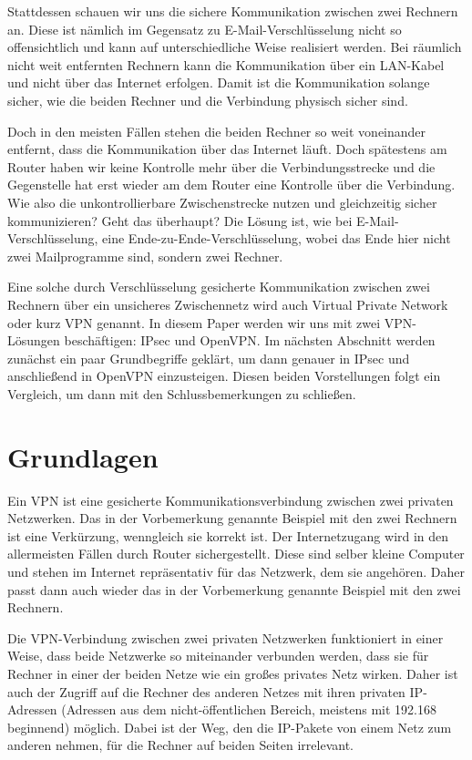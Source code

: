 \documentclass[12pt]{scrartcl}
\begin{document}
Stattdessen schauen wir uns die sichere Kommunikation zwischen zwei Rechnern an. Diese ist nämlich im Gegensatz zu E-Mail-Verschlüsselung nicht so offensichtlich und kann auf unterschiedliche Weise realisiert werden. Bei räumlich nicht weit entfernten Rechnern kann die Kommunikation über ein LAN-Kabel und nicht über das Internet erfolgen. Damit ist die Kommunikation solange sicher, wie die beiden Rechner und die Verbindung physisch sicher sind. 

Doch in den meisten Fällen stehen die beiden Rechner so weit voneinander entfernt, dass die Kommunikation über das Internet läuft. Doch spätestens am Router haben wir keine Kontrolle mehr über die Verbindungsstrecke und die Gegenstelle hat erst wieder am dem Router eine Kontrolle über die Verbindung. Wie also die unkontrollierbare Zwischenstrecke nutzen und gleichzeitig sicher kommunizieren? Geht das überhaupt? Die Lösung ist, wie bei E-Mail-Verschlüsselung, eine Ende-zu-Ende-Verschlüsselung, wobei das Ende hier nicht zwei Mailprogramme sind, sondern zwei Rechner.

Eine solche durch Verschlüsselung gesicherte Kommunikation zwischen zwei Rechnern über ein unsicheres Zwischennetz wird auch Virtual Private Network oder kurz VPN genannt. In diesem Paper werden wir uns mit zwei VPN-Lösungen beschäftigen: IPsec und OpenVPN. Im nächsten Abschnitt werden zunächst ein paar Grundbegriffe geklärt, um dann genauer in IPsec und anschließend in OpenVPN einzusteigen. Diesen beiden Vorstellungen folgt ein Vergleich, um dann mit den Schlussbemerkungen zu schließen.

\section{Grundlagen}
Ein VPN ist eine gesicherte Kommunikationsverbindung zwischen zwei privaten Netzwerken. Das in der Vorbemerkung genannte Beispiel mit den zwei Rechnern ist eine Verkürzung, wenngleich sie korrekt ist. Der Internetzugang wird in den allermeisten Fällen durch Router sichergestellt. Diese sind selber kleine Computer und stehen im Internet repräsentativ für das Netzwerk, dem sie angehören. Daher passt dann auch wieder das in der Vorbemerkung genannte Beispiel mit den zwei Rechnern. 

Die VPN-Verbindung zwischen zwei privaten Netzwerken funktioniert in einer Weise, dass beide Netzwerke so miteinander verbunden werden, dass sie für Rechner in einer der beiden Netze wie ein großes privates Netz wirken. Daher ist auch der Zugriff auf die Rechner des anderen Netzes mit ihren privaten IP-Adressen (Adressen aus dem nicht-öffentlichen Bereich, meistens mit 192.168 beginnend) möglich. Dabei ist der Weg, den die IP-Pakete von einem Netz zum anderen nehmen, für die Rechner auf beiden Seiten irrelevant.
\end{document}
